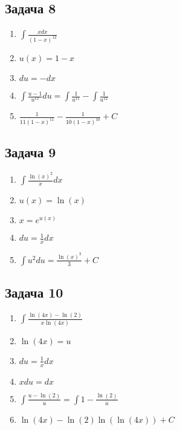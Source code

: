 \documentclass[a4paper,12pt]{article}
\begin{document}
\subsection{Задача 8}
\begin{enumerate}
    \item $\int \frac{x dx}{(1-x)^{12}}$
    \item $u(x) = 1-x$
    \item $du=-dx$
    \item $\int \frac{u-1}{u^{12}}du = \int \frac{1}{u^{11}}-\int \frac{1}{u^{12}}$
    \item $\frac{1}{11(1-x)^{11}}-\frac{1}{10(1-x)^{10}}+C$
\end{enumerate}

\subsection{Задача 9}
\begin{enumerate}
    \item $\int \frac{\ln(x)^2}{x}dx$
    \item $u(x)=\ln(x)$
    \item $x=e^{u(x)}$
    \item $du=\frac{1}{x} dx$
    \item $\int u^2du = \frac{\ln(x)^3}{3}+C$
\end{enumerate}

\subsection{Задача 10}
\begin{enumerate}
    \item $\int \frac{\ln(4x) - \ln(2)}{x\ln(4x)}$
    \item $\ln(4x) = u$
    \item $du = \frac{1}{x}dx$
    \item $xdu = dx$
    \item $\int \frac{u-\ln(2)}{u} = \int 1-\frac{\ln(2)}{u}$
    \item $\ln(4x)-\ln(2)\ln(\ln(4x))+C$
\end{enumerate}
\end{document}
